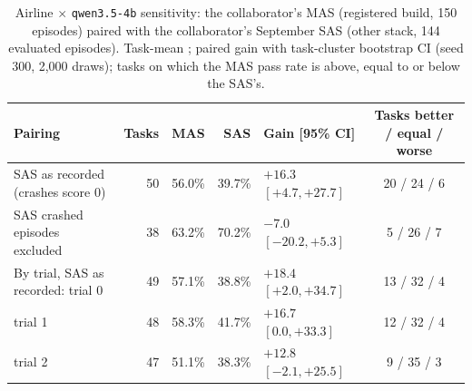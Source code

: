 \begin{table}[H]
\caption{Airline $\times$ \texttt{qwen3.5-4b} sensitivity: the collaborator's MAS (registered build, 150 episodes) paired with the collaborator's September SAS (other stack, 144 evaluated episodes). Task-mean \passone; paired gain with task-cluster bootstrap CI (seed 300, 2,000 draws); tasks on which the MAS pass rate is above, equal to or below the SAS's.}
\label{tab:airline4b}
\begin{center}
\scriptsize
\begin{tabular}{@{}lrrrlc@{}}
\toprule
Pairing & Tasks & MAS & SAS & Gain [95\% CI] & Tasks better / equal / worse \\
\midrule
SAS as recorded (crashes score 0) & 50 & 56.0\% & 39.7\% & $+16.3$ $[+4.7, +27.7]$ & 20 / 24 / 6 \\
SAS crashed episodes excluded & 38 & 63.2\% & 70.2\% & $-7.0$ $[-20.2, +5.3]$ & 5 / 26 / 7 \\
By trial, SAS as recorded: trial 0 & 49 & 57.1\% & 38.8\% & $+18.4$ $[+2.0, +34.7]$ & 13 / 32 / 4 \\
\quad trial 1 & 48 & 58.3\% & 41.7\% & $+16.7$ $[0.0, +33.3]$ & 12 / 32 / 4 \\
\quad trial 2 & 47 & 51.1\% & 38.3\% & $+12.8$ $[-2.1, +25.5]$ & 9 / 35 / 3 \\
\bottomrule
\end{tabular}
\end{center}
\end{table}
